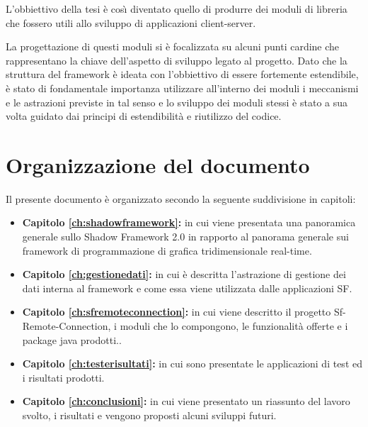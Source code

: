 L'obbiettivo della tesi \`e cos{\`\i} diventato quello di produrre dei moduli di libreria che fossero utili allo sviluppo di applicazioni client-server.

La progettazione di questi moduli si \`e focalizzata su alcuni punti cardine che rappresentano la chiave dell'aspetto di sviluppo legato al progetto. Dato che la struttura del framework \`e ideata con l'obbiettivo di essere fortemente estendibile, \`e stato di fondamentale importanza utilizzare all'interno dei moduli i meccanismi e le astrazioni previste in tal senso e lo sviluppo dei moduli stessi \`e stato a sua volta guidato dai principi di estendibilit\`a e riutilizzo del codice.





\section{Organizzazione del documento}
\label{sec:orgtesi}
Il presente documento \`e organizzato secondo la seguente suddivisione in capitoli:
\begin{itemize}
	\item  \textbf{Capitolo \ref{ch:shadowframework}:} in cui viene presentata una panoramica generale sullo Shadow Framework 2.0 in rapporto al panorama generale sui framework di programmazione di grafica tridimensionale real-time.
	\item  \textbf{Capitolo \ref{ch:gestionedati}:} in cui \`e descritta l'astrazione di gestione dei dati interna al framework e come essa viene utilizzata dalle applicazioni \ac{SF}.
	\item  \textbf{Capitolo \ref{ch:sfremoteconnection}:} in cui viene descritto il progetto Sf-Remote-Connection, i moduli che lo compongono, le funzionalit\`a offerte e i package java prodotti..
	\item  \textbf{Capitolo \ref{ch:testerisultati}:} in cui sono presentate le applicazioni di test ed i risultati prodotti.
	\item  \textbf{Capitolo \ref{ch:conclusioni}:} in cui viene presentato un riassunto del lavoro svolto, i risultati e vengono proposti alcuni sviluppi futuri.
\end{itemize}



